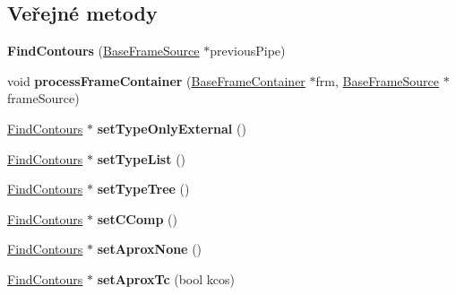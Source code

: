 \subsection*{Veřejné metody}
\begin{DoxyCompactItemize}
\item 
\hypertarget{class_ar_pipe_1_1_find_contours_a45d7cdb88cead31995663199a40bd865}{{\bfseries Find\-Contours} (\hyperlink{class_ar_pipe_1_1_base_frame_source}{Base\-Frame\-Source} $\ast$previous\-Pipe)}\label{db/db3/class_ar_pipe_1_1_find_contours_a45d7cdb88cead31995663199a40bd865}

\item 
\hypertarget{class_ar_pipe_1_1_find_contours_aa014521127836032f288a49e00f88f87}{void {\bfseries process\-Frame\-Container} (\hyperlink{class_ar_pipe_1_1_base_frame_container}{Base\-Frame\-Container} $\ast$frm, \hyperlink{class_ar_pipe_1_1_base_frame_source}{Base\-Frame\-Source} $\ast$frame\-Source)}\label{db/db3/class_ar_pipe_1_1_find_contours_aa014521127836032f288a49e00f88f87}

\item 
\hypertarget{class_ar_pipe_1_1_find_contours_a82244ef64d0f31acbcec69edc00ec44e}{\hyperlink{class_ar_pipe_1_1_find_contours}{Find\-Contours} $\ast$ {\bfseries set\-Type\-Only\-External} ()}\label{db/db3/class_ar_pipe_1_1_find_contours_a82244ef64d0f31acbcec69edc00ec44e}

\item 
\hypertarget{class_ar_pipe_1_1_find_contours_a81c631d105161494348fb9645a57d39b}{\hyperlink{class_ar_pipe_1_1_find_contours}{Find\-Contours} $\ast$ {\bfseries set\-Type\-List} ()}\label{db/db3/class_ar_pipe_1_1_find_contours_a81c631d105161494348fb9645a57d39b}

\item 
\hypertarget{class_ar_pipe_1_1_find_contours_aadfcfc69eadfb8ac6285c6c8e2d71858}{\hyperlink{class_ar_pipe_1_1_find_contours}{Find\-Contours} $\ast$ {\bfseries set\-Type\-Tree} ()}\label{db/db3/class_ar_pipe_1_1_find_contours_aadfcfc69eadfb8ac6285c6c8e2d71858}

\item 
\hypertarget{class_ar_pipe_1_1_find_contours_a429e0aa3153b67a9eff7ec9444cf6c4b}{\hyperlink{class_ar_pipe_1_1_find_contours}{Find\-Contours} $\ast$ {\bfseries set\-C\-Comp} ()}\label{db/db3/class_ar_pipe_1_1_find_contours_a429e0aa3153b67a9eff7ec9444cf6c4b}

\item 
\hypertarget{class_ar_pipe_1_1_find_contours_a8ef65dd34799927f6c4130fdee0327a6}{\hyperlink{class_ar_pipe_1_1_find_contours}{Find\-Contours} $\ast$ {\bfseries set\-Aprox\-None} ()}\label{db/db3/class_ar_pipe_1_1_find_contours_a8ef65dd34799927f6c4130fdee0327a6}

\item 
\hypertarget{class_ar_pipe_1_1_find_contours_a0f81507b31a6128432c1d15c6055c413}{\hyperlink{class_ar_pipe_1_1_find_contours}{Find\-Contours} $\ast$ {\bfseries set\-Aprox\-Tc} (bool kcos)}\label{db/db3/class_ar_pipe_1_1_find_contours_a0f81507b31a6128432c1d15c6055c413}

\end{DoxyCompactItemize}
